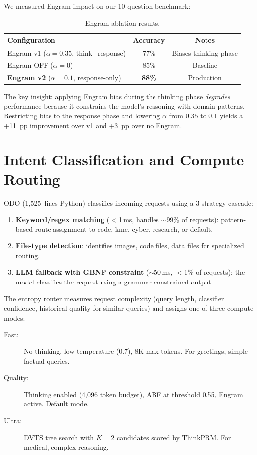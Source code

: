 \documentclass[10pt,a4paper]{article}
\begin{document}
We measured Engram impact on our 10-question benchmark:

\begin{table}[h]
\centering
\caption{Engram ablation results.}
\begin{tabular}{lcc}
\toprule
\textbf{Configuration} & \textbf{Accuracy} & \textbf{Notes} \\
\midrule
Engram v1 ($\alpha{=}0.35$, think+response) & 77\% & Biases thinking phase \\
Engram OFF ($\alpha{=}0$) & 85\% & Baseline \\
\textbf{Engram v2} ($\alpha{=}0.1$, response-only) & \textbf{88\%} & Production \\
\bottomrule
\end{tabular}
\end{table}

The key insight: applying Engram bias during the thinking phase \emph{degrades} performance because it constrains the model's reasoning with domain patterns. Restricting bias to the response phase and lowering $\alpha$ from 0.35 to 0.1 yields a +11~pp improvement over v1 and +3~pp over no Engram.

\section{Intent Classification and Compute Routing}

ODO (1{,}525~lines Python) classifies incoming requests using a 3-strategy cascade:

\begin{enumerate}
  \item \textbf{Keyword/regex matching} ($<$1\,ms, handles $\sim$99\% of requests): pattern-based route assignment to code, kine, cyber, research, or default.
  \item \textbf{File-type detection}: identifies images, code files, data files for specialized routing.
  \item \textbf{LLM fallback with GBNF constraint} ($\sim$50\,ms, $<$1\% of requests): the model classifies the request using a grammar-constrained output.
\end{enumerate}

The entropy router measures request complexity (query length, classifier confidence, historical quality for similar queries) and assigns one of three compute modes:

\begin{description}
  \item[Fast:] No thinking, low temperature (0.7), 8K max tokens. For greetings, simple factual queries.
  \item[Quality:] Thinking enabled (4{,}096 token budget), ABF at threshold 0.55, Engram active. Default mode.
  \item[Ultra:] DVTS tree search with $K{=}2$ candidates scored by ThinkPRM. For medical, complex reasoning.
\end{description}
\end{document}
